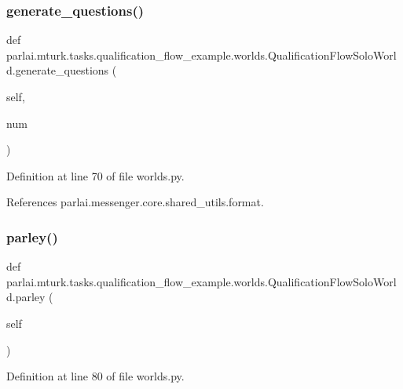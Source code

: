 \subsubsection{\texorpdfstring{generate\+\_\+questions()}{generate\_questions()}}
{\footnotesize\ttfamily def parlai.\+mturk.\+tasks.\+qualification\+\_\+flow\+\_\+example.\+worlds.\+Qualification\+Flow\+Solo\+World.\+generate\+\_\+questions (\begin{DoxyParamCaption}\item[{}]{self,  }\item[{}]{num }\end{DoxyParamCaption})}



Definition at line 70 of file worlds.\+py.



References parlai.\+messenger.\+core.\+shared\+\_\+utils.\+format.

\mbox{\label{classparlai_1_1mturk_1_1tasks_1_1qualification__flow__example_1_1worlds_1_1QualificationFlowSoloWorld_a47ce01979febfd35c072cae4f92ecdba}} 
\subsubsection{\texorpdfstring{parley()}{parley()}}
{\footnotesize\ttfamily def parlai.\+mturk.\+tasks.\+qualification\+\_\+flow\+\_\+example.\+worlds.\+Qualification\+Flow\+Solo\+World.\+parley (\begin{DoxyParamCaption}\item[{}]{self }\end{DoxyParamCaption})}



Definition at line 80 of file worlds.\+py.




